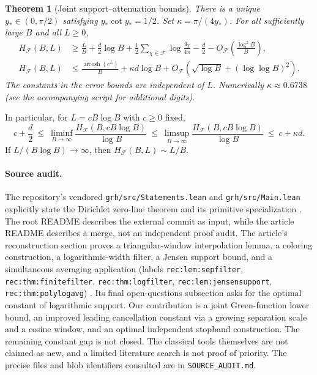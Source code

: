 \documentclass[11pt]{article}
\newtheorem{theorem}{Theorem}
\theoremstyle{remark}\newtheorem{remark}[theorem]{Remark}
\newcommand{\arcosh}{\operatorname{arcosh}}\newcommand{\ord}{\operatorname{ord}}
\newcommand{\F}{\mathcal F}\newcommand{\dd}{\mathrm d}
\begin{document}
\begin{theorem}[Joint support--attenuation bounds]\label{thm:main}
There is a unique $y_*\in(0,\pi/2)$ satisfying $y_*\cot y_*=1/2$. Set $\kappa=\pi/(4y_*)$. For all sufficiently large $B$ and all $L\ge0$,
\begin{align}
 H_{\F}(B,L)&\ge \frac{L}{B}+\frac d2\log B
       +\frac12\sum_{\chi\in\F}\log\frac{q_\chi}{4\pi}-\frac d2
       -O_{\F}\!\left(\frac{\log^2 B}{B}\right),\label{eq:lower}\\
 H_{\F}(B,L)&\le \frac{\arcosh(e^L)}{B}+\kappa d\log B
       +O_{\F}\!\left(\sqrt{\log B}+(\log\log B)^2\right).\label{eq:upper}
\end{align}
The constants in the error bounds are independent of $L$. Numerically $\kappa\approx0.6738$ (see the accompanying script for additional digits).
\end{theorem}
In particular, for $L=cB\log B$ with $c\ge0$ fixed,
\begin{equation}\label{eq:leading}
 c+\frac d2\ \le\ \liminf_{B\to\infty}\frac{H_{\F}(B,cB\log B)}{\log B}
 \ \le\ \limsup_{B\to\infty}\frac{H_{\F}(B,cB\log B)}{\log B}
 \ \le\ c+\kappa d.
\end{equation}
If $L/(B\log B)\to\infty$, then $H_{\F}(B,L)\sim L/B$.

\paragraph{Source audit.} The repository's vendored \texttt{grh/src/Statements.lean} and \texttt{grh/src/Main.lean} explicitly state the Dirichlet zero-line theorem and its primitive specialization \cite{sourcelean}. The root README describes the external commit as input, while the article README describes a merge, not an independent proof audit. The article's reconstruction section proves a triangular-window interpolation lemma, a coloring construction, a logarithmic-width filter, a Jensen support bound, and a simultaneous averaging application (labels \texttt{rec:lem:sepfilter}, \texttt{rec:thm:finitefilter}, \texttt{rec:thm:logfilter}, \texttt{rec:lem:jensensupport}, \texttt{rec:thm:polylogavg}) \cite{rec}. Its final open-questions subsection asks for the optimal constant of logarithmic support. Our contribution is a joint Green-function lower bound, an improved leading cancellation constant via a growing separation scale and a cosine window, and an optimal independent stopband construction. The remaining constant gap is not closed. The classical tools themselves are not claimed as new, and a limited literature search is not proof of priority. The precise files and blob identifiers consulted are in \texttt{SOURCE\_AUDIT.md}.
\end{document}
